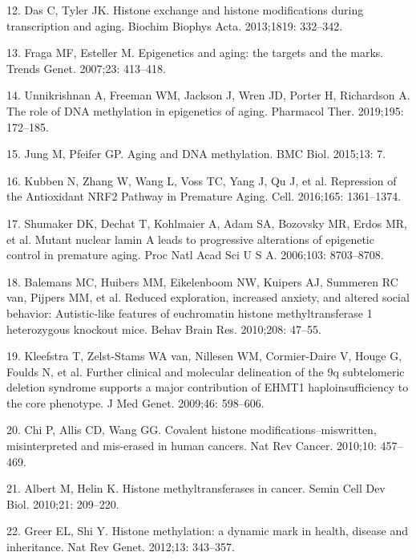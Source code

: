 \documentclass[10pt,letterpaper]{article}
\newenvironment{cslreferences}%
  {}%
  {\par}
\begin{document}
\begin{cslreferences}
\leavevmode\hypertarget{ref-pmid24459735}{}%
12. Das C, Tyler JK. Histone exchange and histone modifications during
transcription and aging. Biochim Biophys Acta. 2013;1819: 332--342.

\leavevmode\hypertarget{ref-pmid17559965}{}%
13. Fraga MF, Esteller M. Epigenetics and aging: the targets and the
marks. Trends Genet. 2007;23: 413--418.

\leavevmode\hypertarget{ref-pmid30419258}{}%
14. Unnikrishnan A, Freeman WM, Jackson J, Wren JD, Porter H, Richardson
A. The role of DNA methylation in epigenetics of aging. Pharmacol Ther.
2019;195: 172--185.

\leavevmode\hypertarget{ref-pmid25637097}{}%
15. Jung M, Pfeifer GP. Aging and DNA methylation. BMC Biol. 2015;13: 7.

\leavevmode\hypertarget{ref-pmid27259148}{}%
16. Kubben N, Zhang W, Wang L, Voss TC, Yang J, Qu J, et al. Repression
of the Antioxidant NRF2 Pathway in Premature Aging. Cell. 2016;165:
1361--1374.

\leavevmode\hypertarget{ref-pmid16738054}{}%
17. Shumaker DK, Dechat T, Kohlmaier A, Adam SA, Bozovsky MR, Erdos MR,
et al. Mutant nuclear lamin A leads to progressive alterations of
epigenetic control in premature aging. Proc Natl Acad Sci U S A.
2006;103: 8703--8708.

\leavevmode\hypertarget{ref-pmid19896504}{}%
18. Balemans MC, Huibers MM, Eikelenboom NW, Kuipers AJ, Summeren RC
van, Pijpers MM, et al. Reduced exploration, increased anxiety, and
altered social behavior: Autistic-like features of euchromatin histone
methyltransferase 1 heterozygous knockout mice. Behav Brain Res.
2010;208: 47--55.

\leavevmode\hypertarget{ref-pmid19264732}{}%
19. Kleefstra T, Zelst-Stams WA van, Nillesen WM, Cormier-Daire V, Houge
G, Foulds N, et al. Further clinical and molecular delineation of the 9q
subtelomeric deletion syndrome supports a major contribution of EHMT1
haploinsufficiency to the core phenotype. J Med Genet. 2009;46:
598--606.

\leavevmode\hypertarget{ref-pmid20574448}{}%
20. Chi P, Allis CD, Wang GG. Covalent histone
modifications--miswritten, misinterpreted and mis-erased in human
cancers. Nat Rev Cancer. 2010;10: 457--469.

\leavevmode\hypertarget{ref-pmid19892027}{}%
21. Albert M, Helin K. Histone methyltransferases in cancer. Semin Cell
Dev Biol. 2010;21: 209--220.

\leavevmode\hypertarget{ref-pmid22473383}{}%
22. Greer EL, Shi Y. Histone methylation: a dynamic mark in health,
disease and inheritance. Nat Rev Genet. 2012;13: 343--357.


\end{cslreferences}
\end{document}
